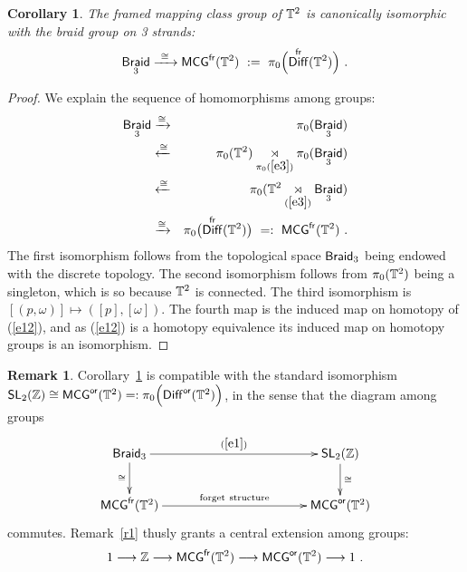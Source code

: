 \documentclass{amsart}
\newtheorem{cor}[theorem]{Corollary}
\theoremstyle{definition}
\newtheorem{remark}[theorem]{Remark}
\theoremstyle{remark}
\DeclareMathOperator{\Diff}{{\sf Diff}}
\DeclareMathOperator{\fr}{\sf fr}
\newcommand{\xra}{\xrightarrow}
\newcommand{\xla}{\xleftarrow}
\DeclareMathOperator{\Braid}{\sf Braid}
\DeclareMathOperator{\SL}{\sf SL}
\begin{document}
\begin{cor}\label{t2}
The \emph{framed mapping class group of $\mathbb T^2$} is canonically isomorphic with the braid group on 3 strands:
\[
\Braid_3
\xra{~\cong~}
{\sf MCG}^{\fr}(\TT^2)
~:=~
\pi_0\Bigl(
\Diff^{\fr}(\TT^2)
\Bigr)
~.
\]
\end{cor}


\begin{proof}
We explain the sequence of homomorphisms among groups:
\begin{eqnarray}
\nonumber
\Braid_3 
&
\xra{\cong}
&
\pi_0(\Braid_3) 
\\
\nonumber
&
\xla{\cong} 
&
\pi_0(\TT^2) \underset{\pi_0(\ref{e3})}\rtimes \pi_0(\Braid_3)
\\
\nonumber
&
\xla{\cong}
&
\pi_0(\TT^2 \underset{(\ref{e3})}\rtimes \Braid_3)
\\
\nonumber
&
\xra{\cong}
&
\pi_0\bigl(\Diff^{\fr}(\TT^2) \bigr)
~=:~
{\sf MCG}^{\fr}(\TT^2)
~.
\end{eqnarray}
The first isomorphism follows from the topological space $\Braid_3$ being endowed with the discrete topology.
The second isomorphism follows from $\pi_0(\mathbb T^2)$ being a singleton, which is so because $\mathbb T^2$ is connected.  
The third isomorphism is $[(p, \omega)] \mapsto ([p], [\omega]).$ The fourth map is the induced map on homotopy of (\ref{e12}), and as (\ref{e12}) is a homotopy equivalence its induced map on homotopy groups is an isomorphism.
\end{proof}




\begin{remark}\label{r2}
Corollary~\ref{t2} is compatible with the standard isomorphism $\SL_2(\ZZ) \cong {\sf MCG}^{\sf or}(\TT^2) =: \pi_0\Bigl(
\Diff^{\sf or}(\TT^2)
\Bigr)$, in the sense that the diagram among groups
\[
\xymatrix{
\Braid_3 \ar[rrrr]^-{(\ref{e1})} \ar[d]_-{\cong}
&&
&&
\SL_2(\ZZ) \ar[d]^-{\cong}
\\
{\sf MCG}^{\fr}(\TT^2)  \ar[rrrr]^-{\rm forget~structure}
&&
&&
{\sf MCG}^{\sf or}(\TT^2)
}
\]
commutes. 
Remark~\ref{r1} thusly grants a central extension among groups:
\begin{equation}\label{e17}
1
\longrightarrow
\ZZ
\longrightarrow
{\sf MCG}^{\fr}(\TT^2)
\longrightarrow
{\sf MCG}^{\sf or}(\TT^2)
\longrightarrow
1
~.
\end{equation}
\end{remark}
\end{document}
